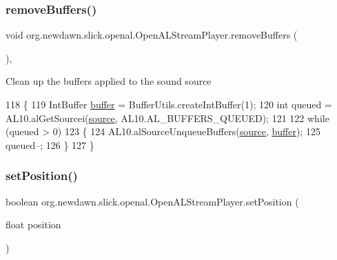 \subsubsection{\texorpdfstring{remove\+Buffers()}{removeBuffers()}}
{\footnotesize\ttfamily void org.\+newdawn.\+slick.\+openal.\+Open\+A\+L\+Stream\+Player.\+remove\+Buffers (\begin{DoxyParamCaption}{ }\end{DoxyParamCaption})\hspace{0.3cm}{\ttfamily [inline]}, {\ttfamily [private]}}

Clean up the buffers applied to the sound source 
\begin{DoxyCode}
118                                  \{
119         IntBuffer \mbox{\hyperlink{classorg_1_1newdawn_1_1slick_1_1openal_1_1_open_a_l_stream_player_a43f0da73ce6a383cda06b37d7927f58f}{buffer}} = BufferUtils.createIntBuffer(1);
120         \textcolor{keywordtype}{int} queued = AL10.alGetSourcei(\mbox{\hyperlink{classorg_1_1newdawn_1_1slick_1_1openal_1_1_open_a_l_stream_player_abe9f7d1ac52a705aa359cf3eb1c69464}{source}}, AL10.AL\_BUFFERS\_QUEUED);
121         
122         \textcolor{keywordflow}{while} (queued > 0)
123         \{
124             AL10.alSourceUnqueueBuffers(\mbox{\hyperlink{classorg_1_1newdawn_1_1slick_1_1openal_1_1_open_a_l_stream_player_abe9f7d1ac52a705aa359cf3eb1c69464}{source}}, \mbox{\hyperlink{classorg_1_1newdawn_1_1slick_1_1openal_1_1_open_a_l_stream_player_a43f0da73ce6a383cda06b37d7927f58f}{buffer}});
125             queued--;
126         \}
127     \}
\end{DoxyCode}
\mbox{\label{classorg_1_1newdawn_1_1slick_1_1openal_1_1_open_a_l_stream_player_ae35c80f50f55bb5efc88aebf809f7d5b}} 
\subsubsection{\texorpdfstring{set\+Position()}{setPosition()}}
{\footnotesize\ttfamily boolean org.\+newdawn.\+slick.\+openal.\+Open\+A\+L\+Stream\+Player.\+set\+Position (\begin{DoxyParamCaption}\item[{float}]{position }\end{DoxyParamCaption})\hspace{0.3cm}{\ttfamily [inline]}}

